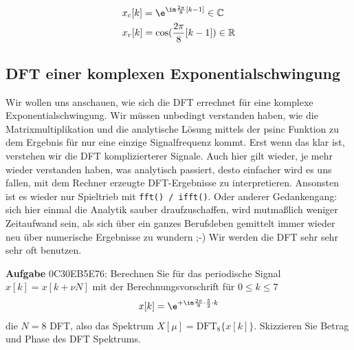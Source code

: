 \begin{Loesung}
\begin{align}
&x_c[k] = \e^{\im \frac{2\pi}{8} [k -1] } \in\mathbb{C}\\
&x_r[k] = \cos(\frac{2\pi}{8} [k-1]) \in\mathbb{R}
\end{align}
\end{Loesung}




















\newpage
\subsection{DFT einer komplexen Exponentialschwingung}
\label{sec:0C30EB5E76}
\begin{Ziel}
Wir wollen uns anschauen, wie sich die DFT errechnet für eine komplexe
Exponentialschwingung. Wir müssen unbedingt verstanden haben, wie die
Matrixmultiplikation und die analytische Lösung mittels der psinc Funktion
zu dem Ergebnis für nur eine einzige Signalfrequenz kommt. Erst wenn das
klar ist, verstehen wir die DFT komplizierterer Signale. Auch hier gilt
wieder, je mehr wieder verstanden haben, was analytisch passiert, desto einfacher
wird es uns fallen, mit dem Rechner erzeugte DFT-Ergebnisse zu interpretieren.
Ansonsten ist es wieder nur Spieltrieb mit \texttt{fft() / ifft()}.
%
Oder anderer Gedankengang: sich hier einmal die Analytik sauber draufzuschaffen,
wird mutmaßlich weniger Zeitaufwand sein, als sich über ein ganzes Berufsleben
gemittelt immer wieder neu über numerische Ergebnisse zu wundern ;-) Wir werden
die DFT sehr sehr sehr oft benutzen.
\end{Ziel}
\textbf{Aufgabe} {\tiny 0C30EB5E76}: Berechnen Sie für das periodische
Signal $x[k]=x[k+\nu N]$
mit der Berechnungsvorschrift für $0\leq k \leq 7$
\begin{align}
x[k] = \e^{+\im \frac{2\pi}{8} \cdot \frac{5}{2} \cdot k}
\end{align}
die $N=8$ DFT, also das Spektrum $X[\mu] = \mathrm{DFT}_8\{x[k]\}$.
%
Skizzieren Sie Betrag und Phase des DFT Spektrums.


